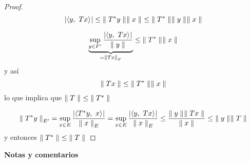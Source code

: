 \begin{proof}
$$
\abs{ \prodint[]{y}{Tx} } \leq \norm[]{T\adj y} \norm[]{x} \leq \norm[]{T\adj} \norm[]{y} \norm[]{x} $$

$$
\underbrace{\sup_{y \in F'} \frac{ \abs{ \prodint[]{y}{Tx} } }{ \norm[]{y} }}_{= \norm[F]{T x}}
\leq \norm[]{T\adj} \norm[]{ x}
$$ y así $$
\norm[]{Tx} \leq \norm[]{T\adj} \norm[]{x}
$$ lo que implica que $
\norm[]{T} \leq \norm[]{T\adj}
$

$$
\norm[E']{ T\adj y } = \sup_{x \in E} \frac{
\abs{ \prodint[]{T\adj y}{x} }
}{
\norm[E]{x}
}
= \sup_{x \in E} \frac{
\abs{ \prodint[]{y}{T x} }
}{
\norm[E]{x}
}
\leq \frac{
\norm[]{y} \norm[]{Tx}
}{
\norm[]{x}
}
\leq \norm[]{y} \norm[]{T}
$$ y entonces $\norm[]{T\adj} \leq \norm[]{T}$

\end{proof}

\textbf{Notas y comentarios}

